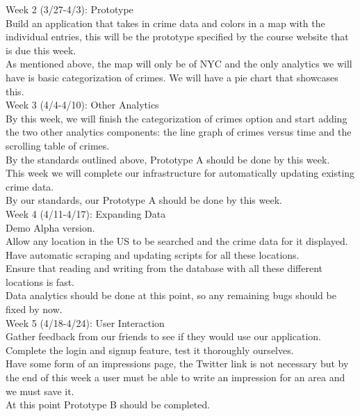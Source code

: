 \documentclass[paper=a4, fontsize=11pt]{scrartcl} %
\numberwithin{equation}{section} %
\numberwithin{figure}{section} %
\numberwithin{table}{section} %
\begin{document}
Week 2 (3/27-4/3): Prototype \\
Build an application that takes in crime data and colors in a map with the individual entries,
this will be the prototype specified by the course website that is due this week. \\
As mentioned above, the map will only be of NYC and the only analytics we will have is basic categorization of crimes. We will have a pie chart that showcases this. \\

Week 3 (4/4-4/10): Other Analytics \\
By this week, we will finish the categorization of crimes option and start adding the two other analytics components: the line graph of crimes versus time and the scrolling table of crimes. \\
By the standards outlined above, Prototype A should be done by this week. \\
This week we will complete our infrastructure for automatically updating existing crime data. \\
By our standards, our Prototype A should be done by this week.\\

Week 4 (4/11-4/17): Expanding Data \\
Demo Alpha version. \\
Allow any location in the US to be searched and the crime data for it displayed. \\
Have automatic scraping and updating scripts for all these locations. \\
Ensure that reading and writing from the database with all these different locations is fast. \\
Data analytics should be done at this point, so any remaining bugs should be fixed by now. \\

Week 5 (4/18-4/24): User Interaction \\
Gather feedback from our friends to see if they would use our application. \\
Complete the login and signup feature, test it thoroughly ourselves. \\
Have some form of an impressions page, the Twitter link is not necessary but by the end of this week a user must be able to write an impression for an area and we must save it. \\
At this point Prototype B should be completed. \\
\end{document}
